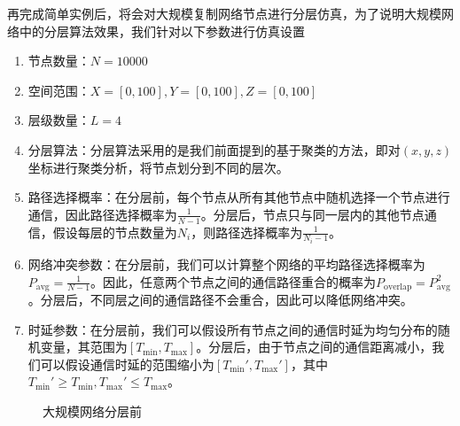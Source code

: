\documentclass[UTF8,a4paper,12pt]{ctexart}
\numberwithin{equation}{section}
\begin{document}
再完成简单实例后，将会对大规模复制网络节点进行分层仿真，为了说明大规模网络中的分层算法效果，我们针对以下参数进行仿真设置
\begin{enumerate}
	\item 节点数量：$N = 10000$
	\item 空间范围：$X = [0, 100], Y = [0, 100], Z = [0, 100]$
	\item 层级数量：$L = 4$
	\item 分层算法：分层算法采用的是我们前面提到的基于聚类的方法，即对$(x, y, z)$坐标进行聚类分析，将节点划分到不同的层次。
	\item 路径选择概率：在分层前，每个节点从所有其他节点中随机选择一个节点进行通信，因此路径选择概率为$\frac{1}{N-1}$。分层后，节点只与同一层内的其他节点通信，假设每层的节点数量为$N_i$，则路径选择概率为$\frac{1}{N_i-1}$。
	\item 网络冲突参数：在分层前，我们可以计算整个网络的平均路径选择概率为$P_{\text{avg}} = \frac{1}{N-1}$。因此，任意两个节点之间的通信路径重合的概率为$P_{\text{overlap}} = P_{\text{avg}}^2$。分层后，不同层之间的通信路径不会重合，因此可以降低网络冲突。
	\item 时延参数：在分层前，我们可以假设所有节点之间的通信时延为均匀分布的随机变量，其范围为$[T_{\text{min}}, T_{\text{max}}]$。分层后，由于节点之间的通信距离减小，我们可以假设通信时延的范围缩小为$[T_{\text{min}}', T_{\text{max}}']$，其中$T_{\text{min}}' \ge T_{\text{min}}, T_{\text{max}}' \le T_{\text{max}}$。
\end{enumerate}
\begin{figure}[H] 
	\caption{大规模网络分层前}
\end{figure}
\end{document}
